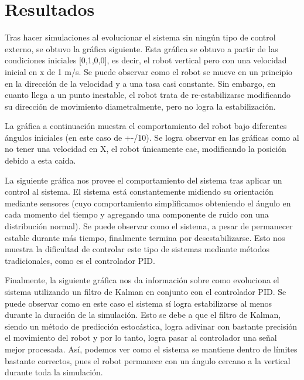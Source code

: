 \documentclass[10pt]{article}
\begin{document}
\section{Resultados}
Tras hacer simulaciones al evolucionar el sistema sin ningún tipo de control externo, se obtuvo la gráfica siguiente. Esta gráfica se obtuvo a partir de las condiciones iniciales [0,1,0,0], es decir, el robot vertical pero con una velocidad inicial en x de 1 m/s. Se puede observar como el robot se mueve en un principio en la dirección de la velocidad y a una tasa casi constante. Sin embargo, en cuanto llega a un punto inestable, el robot trata de re-estabilizarse modificando su dirección de movimiento diametralmente, pero no logra la estabilización.
\begin{center}
\end{center}
La gráfica a continuación muestra el comportamiento del robot bajo diferentes ángulos iniciales (en este caso de +-\textpi /10). Se logra observar en las gráficas como al no tener una velocidad en X, el robot únicamente cae, modificando la posición debido a esta caida.
\begin{center}
\end{center}
La siguiente gráfica nos provee el comportamiento del sistema tras aplicar un control al sistema. El sistema está constantemente midiendo su orientación mediante sensores (cuyo comportamiento simplificamos obteniendo el ángulo en cada momento del tiempo y agregando una componente de ruido con una distribución normal). Se puede observar como el sistema, a pesar de permanecer estable durante más tiempo, finalmente termina por desestabilizarse. Esto nos muestra la dificultad de controlar este tipo de sistemas mediante métodos tradicionales, como es el controlador PID. 
\begin{center}
\end{center}
Finalmente, la siguiente gráfica nos da información sobre como evoluciona el sistema utilizando un filtro de Kalman en conjunto con el controlador PID. Se puede observar como en este caso el sistema sí logra estabilizarse al menos durante la duración de la simulación. Esto se debe a que el filtro de Kalman, siendo un método de predicción estocástica, logra adivinar con bastante precisión el movimiento del robot y por lo tanto, logra pasar al controlador una señal mejor procesada. Así, podemos ver como el sistema se mantiene dentro de límites bastante correctos, pues el robot permanece con un ángulo cercano a la vertical durante toda la simulación.
\end{document}
